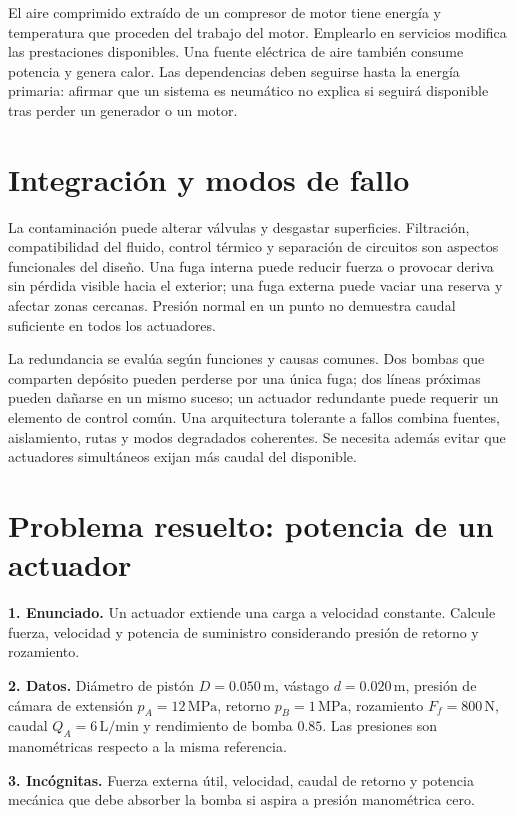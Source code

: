 El aire comprimido extraído de un compresor de motor tiene energía y temperatura que proceden del trabajo del motor. Emplearlo en servicios modifica las prestaciones disponibles. Una fuente eléctrica de aire también consume potencia y genera calor. Las dependencias deben seguirse hasta la energía primaria: afirmar que un sistema es neumático no explica si seguirá disponible tras perder un generador o un motor.

\section{Integración y modos de fallo}
La contaminación puede alterar válvulas y desgastar superficies. Filtración, compatibilidad del fluido, control térmico y separación de circuitos son aspectos funcionales del diseño. Una fuga interna puede reducir fuerza o provocar deriva sin pérdida visible hacia el exterior; una fuga externa puede vaciar una reserva y afectar zonas cercanas. Presión normal en un punto no demuestra caudal suficiente en todos los actuadores.

La redundancia se evalúa según funciones y causas comunes. Dos bombas que comparten depósito pueden perderse por una única fuga; dos líneas próximas pueden dañarse en un mismo suceso; un actuador redundante puede requerir un elemento de control común. Una arquitectura tolerante a fallos combina fuentes, aislamiento, rutas y modos degradados coherentes. Se necesita además evitar que actuadores simultáneos exijan más caudal del disponible.

\section{Problema resuelto: potencia de un actuador}
\textbf{1. Enunciado.} Un actuador extiende una carga a velocidad constante. Calcule fuerza, velocidad y potencia de suministro considerando presión de retorno y rozamiento.

\textbf{2. Datos.} Diámetro de pistón $D=0.050\,\mathrm{m}$, vástago $d=0.020\,\mathrm{m}$, presión de cámara de extensión $p_A=12\,\mathrm{MPa}$, retorno $p_B=1\,\mathrm{MPa}$, rozamiento $F_f=800\,\mathrm{N}$, caudal $Q_A=6\,\mathrm{L/min}$ y rendimiento de bomba $0.85$. Las presiones son manométricas respecto a la misma referencia.

\textbf{3. Incógnitas.} Fuerza externa útil, velocidad, caudal de retorno y potencia mecánica que debe absorber la bomba si aspira a presión manométrica cero.

